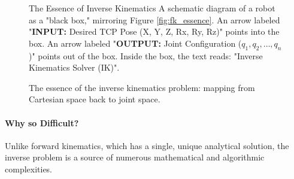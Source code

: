 \begin{figure}[h!]
    \centering
    \begin{infobox}{The Essence of Inverse Kinematics}
        A schematic diagram of a robot as a "black box," mirroring Figure \ref{fig:fk_essence}.
        An arrow labeled "\textbf{INPUT:} Desired TCP Pose (X, Y, Z, Rx, Ry, Rz)" points into the box.
        An arrow labeled "\textbf{OUTPUT:} Joint Configuration ($q_1, q_2, \dots, q_n$)" points out of the box.
        Inside the box, the text reads: "Inverse Kinematics Solver (IK)".
    \end{infobox}
    \caption{The essence of the inverse kinematics problem: mapping from Cartesian space back to joint space.}
    \label{fig:ik_essence}
\end{figure}

\paragraph{Why so Difficult?}
Unlike forward kinematics, which has a single, unique analytical solution, the inverse problem is a source of numerous mathematical and algorithmic complexities.

